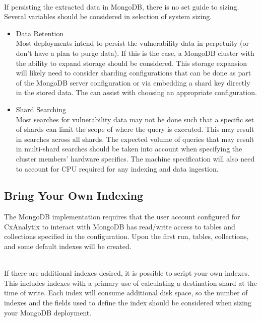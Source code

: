 \noindent\\If persisting the extracted data in MongoDB, there is no set guide to sizing. Several variables should be considered in selection of system sizing.

\begin{itemize}
    \item Data Retention\\
    Most deployments intend to persist the vulnerability data in perpetuity (or don't have a plan to purge data). 
    If this is the case, a MongoDB cluster with the ability to expand storage should be considered. This storage expansion will likely need to consider 
    sharding configurations that can be done as part of the MongoDB server configuration or via embedding a shard key directly in the stored data. 
    The  can assist with choosing an appropriate configuration.

    \item Shard Searching\\
    Most searches for vulnerability data may not be done such that a specific set of shards can limit the scope of where the query is executed. This may result
    in searches across all shards. The expected volume of queries that may result in multi-shard searches should be taken into account when specifying the 
    cluster members' hardware specifics. The machine specification will also need to account for CPU required for any indexing and data ingestion.
\end{itemize}

\subsection{Bring Your Own Indexing}\label{sec:bringyourownindex}

The MongoDB implementation requires that the user account configured for CxAnalytix to interact with MongoDB has read/write access to tables and 
collections specified in the configuration.  Upon the first run, tables, collections, and some default indexes will be created.

\noindent\\If there are additional indexes desired, it is possible to script your own indexes.  This includes indexes with a primary use of calculating a
destination shard at the time of write.  Each index will consume additional disk space, so the number of indexes and the fields used to define the index
should be considered when sizing your MongoDB deployment.


